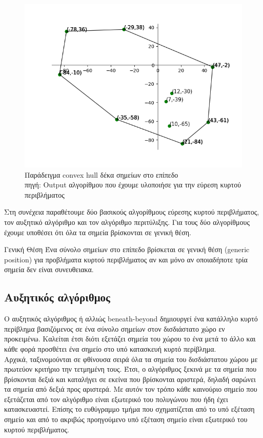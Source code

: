 \documentclass[oneside,12pt]{book}
\newenvironment{matlab}
	{\begin{figure}[hp]\centering\captionsetup{justification=centering}}
	{\end{figure}}
\theoremstyle{definition}
\begin{document}
\begin{matlab}
	\includegraphics[scale=0.8]{images/convexhull.png}
	\caption{Παράδειγμα convex hull δέκα σημείων στο επίπεδο \\ πηγή: Output αλγορίθμου που έχουμε υλοποιήσε για την εύρεση κυρτού περιβλήματος}
\end{matlab}

Στη συνέχεια παραθέτουμε δύο βασικούς αλγορίθμους εύρεσης κυρτού περιβλήματος, τον αυξητικό αλγόριθμο και τον αλγόριθμο περιτύλιξης. Για τους δύο αλγορίθμους έχουμε υποθέσει ότι όλα τα σημεία βρίσκονται σε γενική θέση.

\begin{mydefinition}{Γενική Θέση}{}
	Ένα σύνολο σημείων στο επίπεδο βρίσκεται σε γενική θέση (generic position) για προβλήματα κυρτού περιβλήματος αν και μόνο αν οποιαδήποτε τρία σημεία δεν είναι συνευθειακα.
\end{mydefinition}

\subsection{Αυξητικός αλγόριθμος}

Ο αυξητικός αλγόριθμος ή αλλιώς beneath-beyond δημιουργεί ένα κατάλληλο κυρτό περίβλημα βασιζόμενος σε ένα σύνολο σημείων στον δισδιάστατο χώρο εν προκειμένω. Καλείται έτσι διότι εξετάζει σημεία του χώρου το ένα μετά το άλλο και κάθε φορά προσθέτει ένα σημείο στο υπό κατασκευή κυρτό περίβλημα. \\

Αρχικά, ταξινομούνται σε φθίνουσα σειρά όλα τα σημεία του δισδιάστατου χώρου με πρωτεύον κριτήριο την τετμημένη τους. Έτσι, ο αλγόριθμος ξεκινά με τα σημεία που βρίσκονται δεξιά και καταλήγει σε εκείνα που βρίσκονται αριστερά, δηλαδή σαρώνει τα σημεία από δεξιά προς αριστερά. Με αυτόν τον τρόπο κάθε καινούριο σημείο που εξετάζεται από τον αλγόριθμο είναι εξωτερικό του πολυγώνου που ήδη έχει κατασκευαστεί. Επίσης το ευθύγραμμο τμήμα που σχηματίζεται από το υπό εξέταση σημείο και από το ακριβώς προηγούμενο υπό εξέταση σημείο είναι εξωτερικό του κυρτού περιβλήματος. \\
\end{document}
